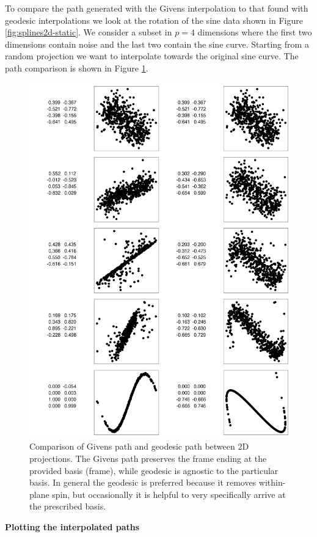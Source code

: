 \documentclass{article}
\begin{document}
To compare the path generated with the Givens interpolation to that
found with geodesic interpolations we look at the rotation of the sine
data shown in Figure \ref{fig:splines2d-static}. We consider a subset in
\(p=4\) dimensions where the first two dimensions contain noise and the
last two contain the sine curve. Starting from a random projection we
want to interpolate towards the original sine curve. The path comparison
is shown in Figure \ref{fig:compare-paths}.

\begin{figure}

{\centering \includegraphics[width=0.8\linewidth]{figures/compare-paths} 

}

\caption{Comparison of Givens path and geodesic path between 2D projections. The Givens path preserves the frame ending at the provided basis (frame), while geodesic is agnostic to the particular basis. In general the geodesic is preferred because it removes within-plane spin, but occasionally it is helpful to very specifically arrive at the prescribed basis.}\label{fig:compare-paths}
\end{figure}

\textbf{Plotting the interpolated paths}
\end{document}
